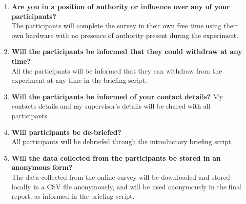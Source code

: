 \begin{enumerate}
    \item \textbf{Are you in a position of authority or influence over any of your 	participants?}\\
    The participants will complete the survey in their own free time using their own hardware with no presence of authority present during the experiment.
    \item \textbf{Will the participants be informed that they could withdraw at any time?}\\
    All the participants will be informed that they can withdraw from the experiment at any time in the briefing script.
    \item \textbf{Will the participants be informed of your contact details?}
    My contacts details and my supervisor's details will be shared with all participants.
    \item \textbf{Will participants be de-briefed?}\\
    All participants will be debriefed through the introductory briefing script.
    \item \textbf{Will the data collected from the participants be stored in an anonymous form?}\\
    The data collected from the online survey will be downloaded and stored locally in a CSV file anonymously, and will be used anonymously in the final report, as informed in the briefing script.
\end{enumerate}